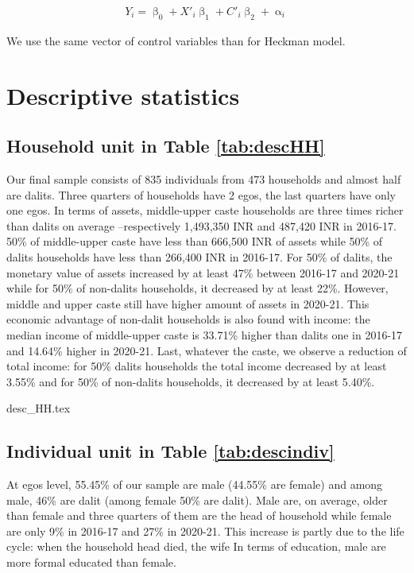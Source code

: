 \documentclass[a4paper, 11pt, onecolumn]{article}
\begin{document}
\begin{equation}\label{eq:mprobit}
\begin{split}
Y_{i}=\upbeta_{0}+X'_{i}\upbeta_{1}+C'_{i}\upbeta_{2}+\upalpha_{i}
\end{split}
\end{equation}

We use the same vector of control variables than for Heckman model.




\newpage
\section{Descriptive statistics}

\subsection{Household unit in Table \ref{tab:descHH}}
Our final sample consists of 835 individuals from 473 households and almost half are dalits.
Three quarters of households have 2 egos, the last quarters have only one egos.
In terms of assets, middle-upper caste households are three times richer than dalits on average --respectively 1,493,350 INR and 487,420 INR in 2016-17.
50\% of middle-upper caste have less than 666,500 INR of assets while 50\% of dalits households have less than 266,400 INR in 2016-17.
For 50\% of dalits, the monetary value of assets increased by at least 47\% between 2016-17 and 2020-21 while for 50\% of non-dalits households, it decreased by at least 22\%.
However, middle and upper caste still have higher amount of assets in 2020-21.
This economic advantage of non-dalit households is also found with income: the median income of middle-upper caste is 33.71\% higher than dalits one in 2016-17 and 14.64\% higher in 2020-21.
Last, whatever the caste, we observe a reduction of total income: for 50\% dalits households the total income decreased by at least 3.55\% and for 50\% of non-dalits households, it decreased by at least 5.40\%.
		
{desc_HH.tex}

\subsection{Individual unit in Table \ref{tab:descindiv}}
At egos level, 55.45\% of our sample are male (44.55\% are female) and among male, 46\% are dalit (among female 50\% are dalit).
Male are, on average, older than female and three quarters of them are the head of household while female are only 9\% in 2016-17 and 27\% in 2020-21.
This increase is partly due to the life cycle: when the household head died, the wife 
In terms of education, male are more formal educated than female.
\end{document}
